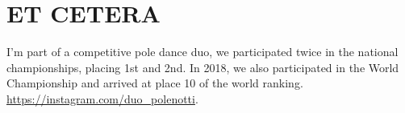 \section{ET CETERA}

I'm part of a competitive pole dance duo, we participated twice in the national championships, placing 1st and 2nd. In 2018, we also participated in the World Championship and arrived at place 10 of the world ranking. \url{https://instagram.com/duo_polenotti}.